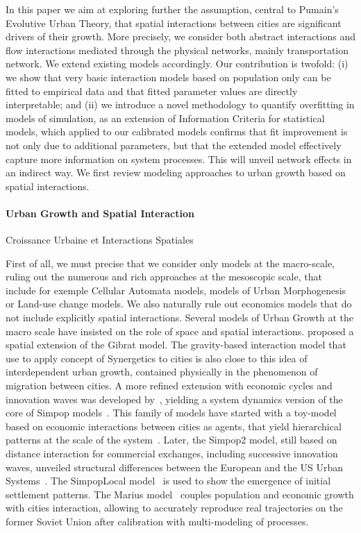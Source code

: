 In this paper we aim at exploring further the assumption, central to Pumain's Evolutive Urban Theory, that spatial interactions between cities are significant drivers of their growth. More precisely, we consider both abstract interactions and flow interactions mediated through the physical networks, mainly transportation network. We extend existing models accordingly. Our contribution is twofold: (i) we show that very basic interaction models based on population only can be fitted to empirical data and that fitted parameter values are directly interpretable; and (ii) we introduce a novel methodology to quantify overfitting in models of simulation, as an extension of Information Criteria for statistical models, which applied to our calibrated models confirms that fit improvement is not only due to additional parameters, but that the extended model effectively capture more information on system processes. This will unveil network effects in an indirect way. We first review modeling approaches to urban growth based on spatial interactions.


\paragraph{Urban Growth and Spatial Interaction}{Croissance Urbaine et Interactions Spatiales}

First of all, we must precise that we consider only models at the macro-scale, ruling out the numerous and rich approaches at the mesoscopic scale, that include for exemple Cellular Automata models, models of Urban Morphogenesis or Land-use change models. We also naturally rule out economics models that do not include explicitly spatial interactions. Several models of Urban Growth at the macro scale have insisted on the role of space and spatial interactions. \cite{bretagnolle2000long} proposed a spatial extension of the Gibrat model. The gravity-based interaction model that~\cite{sanders1992systeme} use to apply concept of Synergetics to cities is also close to this idea of interdependent urban growth, contained physically in the phenomenon of migration between cities. A more refined extension with economic cycles and innovation waves was developed by~\cite{favaro2011gibrat}, yielding a system dynamics version of the core of Simpop models~\citep{pumain2012multi}. This family of models have started with a toy-model based on economic interactions between cities as agents, that yield hierarchical patterns at the scale of the system~\citep{sanders1997simpop}. Later, the Simpop2 model, still based on distance interaction for commercial exchanges, including successive innovation waves, unveiled structural differences between the European and the US Urban Systems~\citep{bretagnolle2010comparer}. The SimpopLocal model~\citep{pumain2017simpoplocal} is used to show the emergence of initial settlement patterns. The Marius model~\citep{cottineau2014evolution} couples population and economic growth with cities interaction, allowing to accurately reproduce real trajectories on the former Soviet Union after calibration with multi-modeling of processes.


